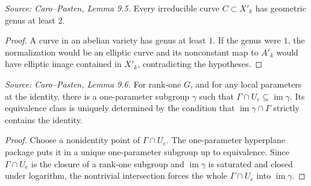 \begin{lemma}
  \label{lem:cp_special_fibre_curve_genus}
  \textit{Source: Caro--Pasten, Lemma 9.5.}
  Every irreducible curve \(C\subset X'_k\) has geometric genus at least \(2\).
\end{lemma}
\begin{proof}
  A curve in an abelian variety has genus at least \(1\).  If the genus were
  \(1\), the normalization would be an elliptic curve and its nonconstant map
  to \(A'_k\) would have elliptic image contained in \(X'_k\), contradicting
  the hypotheses.
\end{proof}

\begin{lemma}
  \label{lem:cp_choice_one_parameter_subgroup}
  \textit{Source: Caro--Pasten, Lemma 9.6.}
  For rank-one \(G\), and for any local parameters at the identity, there is a
  one-parameter subgroup \(\gamma\) such that
  \(\Gamma\cap U_e\subseteq\operatorname{im}\gamma\).  Its equivalence class is
  uniquely determined by the condition that \(\operatorname{im}\gamma\cap\Gamma\)
  strictly contains the identity.
\end{lemma}
\begin{proof}
  Choose a nonidentity point of \(\Gamma\cap U_e\).  The one-parameter
  hyperplane package puts it in a unique one-parameter subgroup up to
  equivalence.  Since \(\Gamma\cap U_e\) is the closure of a rank-one subgroup
  and \(\operatorname{im}\gamma\) is saturated and closed under logarithm, the
  nontrivial intersection forces the whole \(\Gamma\cap U_e\) into
  \(\operatorname{im}\gamma\).
\end{proof}


